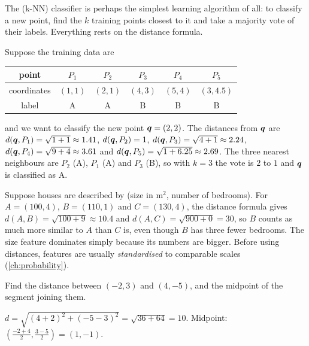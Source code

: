 \begin{mlnote}
The  (k-NN) classifier is perhaps the simplest
learning algorithm of all: to classify a new point, find the $k$ training
points closest to it and take a majority vote of their labels. Everything
rests on the distance formula.

Suppose the training data are
\begin{center}
\begin{tabular}{cccccc}
\toprule
point & $P_1$ & $P_2$ & $P_3$ & $P_4$ & $P_5$\\
\midrule
coordinates & $(1,1)$ & $(2,1)$ & $(4,3)$ & $(5,4)$ & $(3,4.5)$\\
label & A & A & B & B & B\\
\bottomrule
\end{tabular}
\end{center}
and we want to classify the new point $\bm{q} = (2, 2)$. The distances from
$\bm{q}$ are $d(\bm{q}, P_1) = \sqrt{1 + 1} \approx 1.41$, $d(\bm{q}, P_2) = 1$,
$d(\bm{q}, P_3) = \sqrt{4 + 1} \approx 2.24$, $d(\bm{q}, P_4) = \sqrt{9 + 4}
\approx 3.61$ and $d(\bm{q}, P_5) = \sqrt{1 + 6.25} \approx 2.69$. The three
nearest neighbours are $P_2$ (A), $P_1$ (A) and $P_3$ (B), so with $k = 3$ the
vote is $2$ to $1$ and $\bm{q}$ is classified as A.
\end{mlnote}

\begin{pitfall}
Suppose houses are described by (size in m$^2$, number of bedrooms). For
$A = (100, 4)$, $B = (110, 1)$ and $C = (130, 4)$, the distance formula gives
$d(A, B) = \sqrt{100 + 9} \approx 10.4$ and $d(A, C) = \sqrt{900 + 0} = 30$, so
$B$ counts as much more similar to $A$ than $C$ is, even though $B$ has three
fewer bedrooms. The size feature dominates simply because its numbers are
bigger. Before using distances, features are usually \emph{standardised} to
comparable scales (\cref{ch:probability}).
\end{pitfall}

\sectionexercises

\begin{exercise}
Find the distance between $(-2, 3)$ and $(4, -5)$, and the midpoint of the
segment joining them.
\end{exercise}
\begin{solution}
$d = \sqrt{(4 + 2)^2 + (-5 - 3)^2} = \sqrt{36 + 64} = 10$. Midpoint:
$\left(\tfrac{-2 + 4}{2}, \tfrac{3 - 5}{2}\right) = (1, -1)$.
\end{solution}

